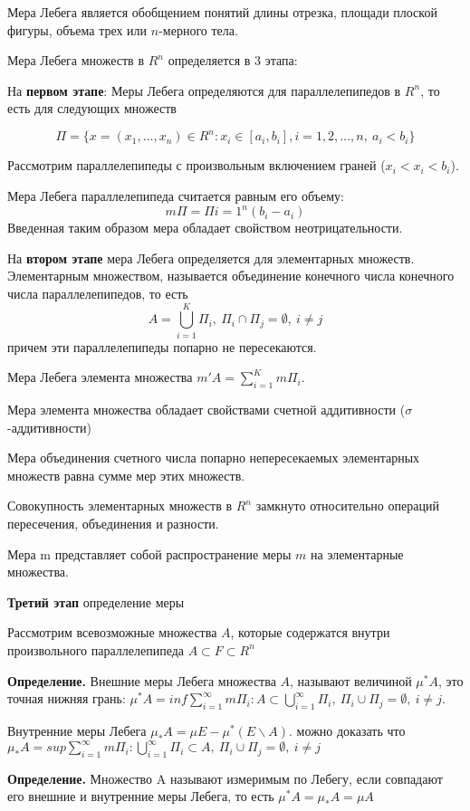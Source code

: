 \documentclass[14pt,a4paper]{extarticle}
\theoremstyle{definition}
\theoremstyle{remark}
\renewcommand{\[}{\begin{dmath*}[compact]}
\renewcommand{\]}{\end{dmath*}}
\newcommand{\sep}{ , \ \allowbreak }
\newcommand{\tdef}{\textbf{Определение.} }
\begin{document}
Мера Лебега является обобщением понятий длины отрезка, площади плоской фигуры, объема трех или $n$-мерного тела.

Мера Лебега множеств в $R^n$ определяется в 3 этапа:

На \textbf{первом этапе}: Меры Лебега определяются для параллелепипедов в $R^n$, то есть для следующих множеств

\[
  \Pi = \{x=(x_1,\dots,x_n)\in R^n: x_i\in [a_i,b_i], i=1,2,\dots,n\sep a_i<b_i\}
\]

Рассмотрим параллелепипеды с произвольным включением граней ($x_i<x_i<b_i$).

Мера Лебега параллелепипеда считается равным его объему:
\[m\Pi = \Pi{i=1}^n(b_i-a_i)\]
Введенная таким образом мера обладает свойством неотрицательности.

На \textbf{втором этапе} мера Лебега определяется для элементарных множеств. Элементарным множеством, называется объединение конечного числа конечного числа параллелепипедов, то есть
\[A=\bigcup _{i=1}^K \Pi_i\sep\Pi_i \cap \Pi_j = \emptyset \sep i\neq j\]
причем эти параллелепипеды попарно не пересекаются.

Мера Лебега элемента множества $m'A=\sum_{i=1}^Km\Pi_i$.

Мера элемента множества обладает свойствами счетной аддитивности ($\sigma$-аддитивности)

Мера объединения счетного числа попарно непересекаемых элементарных множеств равна сумме мер этих множеств.

Совокупность элементарных множеств в $R^n$ замкнуто относительно операций пересечения, объединения и разности.

Мера m представляет собой распространение меры $m$ на элементарные множества.

\textbf{Третий этап} определение меры

Рассмотрим всевозможные множества $A$, которые содержатся внутри произвольного параллелепипеда $A\subset F \subset R^n$

\tdef Внешние меры Лебега множества $A$, называют величиной $\mu^*A$, это точная нижняя грань: $\mu^*A=inf\sum_{i=1}^\infty m\Pi_i: A\subset\bigcup _{i=1}^\infty\Pi_i\sep \Pi_i\cup\Pi_j=\emptyset\sep i\neq j$.

Внутренние меры Лебега $\mu_*A=\mu E-\mu^*(E\backslash A)$. можно доказать что $\mu_*A=sup\sum_{i=1}^\infty m\Pi_i: \bigcup _{i=1}^\infty\Pi_i \subset A\sep \Pi_i\cup\Pi_j=\emptyset\sep i\neq j$

\tdef Множество A называют измеримым по Лебегу, если совпадают его внешние и внутренние меры Лебега, то есть $\mu^*A=\mu_*A=\mu A$
\end{document}
